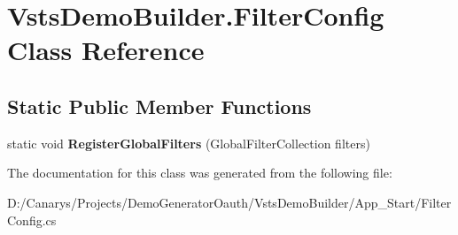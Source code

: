 \hypertarget{class_vsts_demo_builder_1_1_filter_config}{}\section{Vsts\+Demo\+Builder.\+Filter\+Config Class Reference}
\label{class_vsts_demo_builder_1_1_filter_config}
\subsection*{Static Public Member Functions}
\begin{DoxyCompactItemize}
\item 
\mbox{\label{class_vsts_demo_builder_1_1_filter_config_a6015bf13865a83d8815e945da8cc5c63}} 
static void {\bfseries Register\+Global\+Filters} (Global\+Filter\+Collection filters)
\end{DoxyCompactItemize}


The documentation for this class was generated from the following file\+:\begin{DoxyCompactItemize}
\item 
D\+:/\+Canarys/\+Projects/\+Demo\+Generator\+Oauth/\+Vsts\+Demo\+Builder/\+App\+\_\+\+Start/Filter\+Config.\+cs\end{DoxyCompactItemize}
